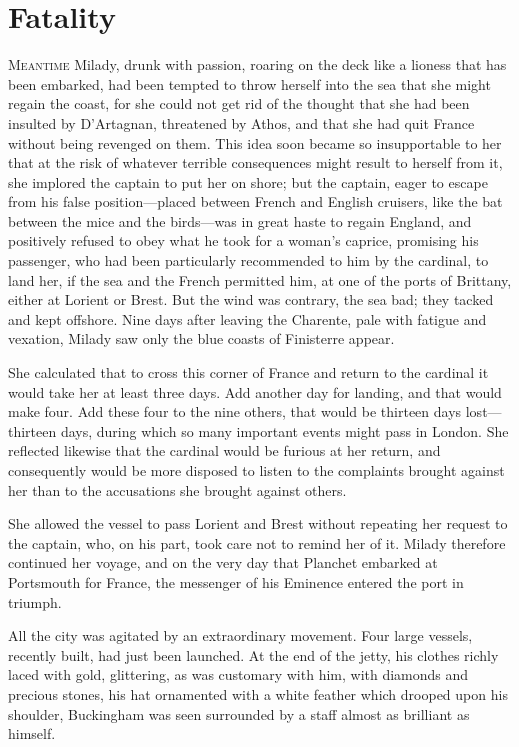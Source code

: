 
\chapter{Fatality}

\lettrine{M}{eantime} Milady, drunk with passion, roaring on the deck like a lioness that has been embarked, had been tempted to throw herself into the sea that she might regain the coast, for she could not get rid of the thought that she had been insulted by D'Artagnan, threatened by Athos, and that she had quit France without being revenged on them. This idea soon became so insupportable to her that at the risk of whatever terrible consequences might result to herself from it, she implored the captain to put her on shore; but the captain, eager to escape from his false position—placed between French and English cruisers, like the bat between the mice and the birds—was in great haste to regain England, and positively refused to obey what he took for a woman's caprice, promising his passenger, who had been particularly recommended to him by the cardinal, to land her, if the sea and the French permitted him, at one of the ports of Brittany, either at Lorient or Brest. But the wind was contrary, the sea bad; they tacked and kept offshore. Nine days after leaving the Charente, pale with fatigue and vexation, Milady saw only the blue coasts of Finisterre appear. 

She calculated that to cross this corner of France and return to the cardinal it would take her at least three days. Add another day for landing, and that would make four. Add these four to the nine others, that would be thirteen days lost—thirteen days, during which so many important events might pass in London. She reflected likewise that the cardinal would be furious at her return, and consequently would be more disposed to listen to the complaints brought against her than to the accusations she brought against others. 

She allowed the vessel to pass Lorient and Brest without repeating her request to the captain, who, on his part, took care not to remind her of it. Milady therefore continued her voyage, and on the very day that Planchet embarked at Portsmouth for France, the messenger of his Eminence entered the port in triumph. 

All the city was agitated by an extraordinary movement. Four large vessels, recently built, had just been launched. At the end of the jetty, his clothes richly laced with gold, glittering, as was customary with him, with diamonds and precious stones, his hat ornamented with a white feather which drooped upon his shoulder, Buckingham was seen surrounded by a staff almost as brilliant as himself. 

